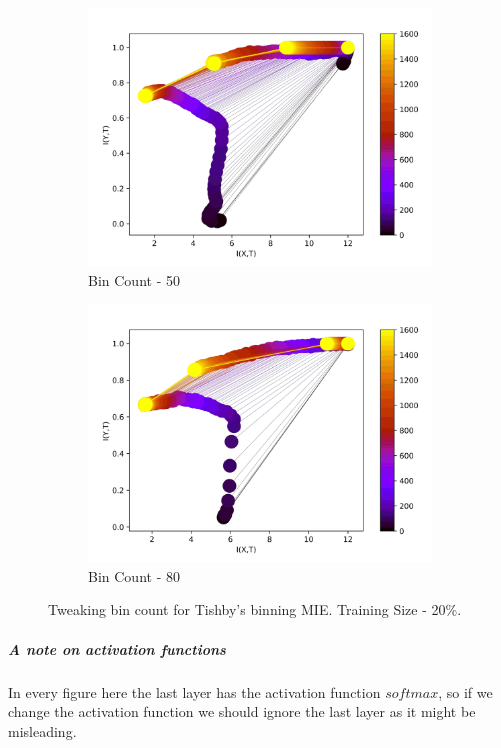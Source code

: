 \documentclass[dissertation.tex]{subfiles}
\begin{document}
\begin{figure}[ht]
\begin{subfigure}[t]{0.24\textwidth}
    \centering
    \includegraphics[width=\textwidth]{figs/eval/binCount/Binning50.jpg}
    \caption{
      Bin Count - 50
    }
    \label{figBinCount50}
  \end{subfigure}
  \hfill
  \begin{subfigure}[t]{0.24\textwidth}
    \centering
    \includegraphics[width=\textwidth]{figs/eval/binCount/Binning80.jpg}
    \caption{
      Bin Count - 80
    }
    \label{figBinCount80}
  \end{subfigure}
  \hfill
  \caption{
      Tweaking bin count for Tishby's binning MIE. Training Size - 20\%. 
    }
  \label{figBinCount}
\end{figure}


\subparagraph{A note on activation functions} In every figure here the last
layer has the activation function $softmax$, so if we change the activation
function we should ignore the last layer as it might be misleading.
\end{document}
